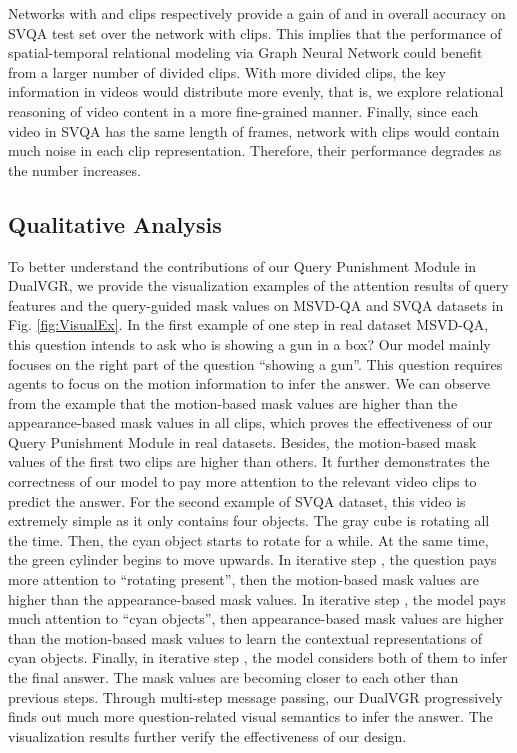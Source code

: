 \documentclass[journal]{IEEEtran}
\begin{document}
Networks with  and  clips respectively provide a gain of  and  in overall accuracy on SVQA test set over the network with  clips. This implies that the performance of spatial-temporal relational modeling via Graph Neural Network could benefit from a larger number of divided clips. With more divided clips, the key information in videos would distribute more evenly, that is, we explore relational reasoning of video content in a more fine-grained manner. Finally, since each video in SVQA has the same length of  frames, network with  clips would contain much noise in each clip representation. Therefore, their performance degrades as the number  increases.  
\subsection{Qualitative Analysis}
To better understand the contributions of our Query Punishment Module in DualVGR, we provide the visualization examples of the attention results of query features and the query-guided mask values on MSVD-QA and SVQA datasets in Fig. \ref{fig:VisualEx}.
In the first example of one step in real dataset MSVD-QA, this question intends to ask who is showing a gun in a box? Our model mainly focuses on the right part of the question ``showing a gun''. This question requires agents to focus on the motion information to infer the answer. We can observe from the example that the motion-based mask values are higher than the appearance-based mask values in all clips, which proves the effectiveness of our Query Punishment Module in real datasets. Besides, the motion-based mask values of the first two clips are higher than others. It further demonstrates the correctness of our model to pay more attention to the relevant video clips to predict the answer. For the second example of SVQA dataset, this video is extremely simple as it only contains four objects. The gray cube is rotating all the time. Then, the cyan object starts to rotate for a while. At the same time, the green cylinder begins to move upwards. In iterative step  , the question pays more attention to ``rotating present'', then the motion-based mask values are higher than the appearance-based mask values. In iterative step , the model pays much attention to ``cyan objects'', then appearance-based mask values are higher than the motion-based mask values to learn the contextual representations of cyan objects. Finally, in iterative step , the model considers both of them to infer the final answer. The mask values are becoming closer to each other than previous steps. Through multi-step message passing, our DualVGR progressively finds out much more question-related visual semantics to infer the answer. The visualization results further verify the effectiveness of our design.
\end{document}
